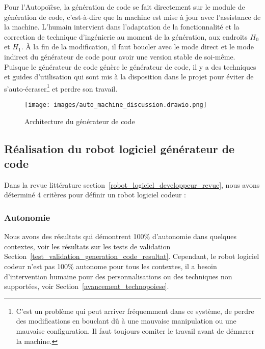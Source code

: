 Pour l'Autopoïèse, la génération de code se fait directement sur le module de génération de code, c'est-à-dire que la machine est mise à jour avec l'assistance de la machine. L'humain intervient dans l'adaptation de la fonctionnalité et la correction de technique d'ingénierie au moment de la génération, aux endroits $H_0$ et $H_1$. À la fin de la modification, il faut boucler avec le mode direct et le mode indirect du générateur de code pour avoir une version stable de soi-même. Puisque le générateur de code génère le générateur de code, il y a des techniques et guides d'utilisation qui sont mis à la disposition dans le projet pour éviter de s'auto-écraser\footnote{C'est un problème qui peut arriver fréquemment dans ce système, de perdre des modifications en bouclant dû à une mauvaise manipulation ou une mauvaise configuration. Il faut toujours comiter le travail avant de démarrer la machine.} et perdre son travail.

\begin{figure}
\centering
\texttt{[image: images/auto\_machine\_discussion.drawio.png]}
\caption{Architecture du générateur de code}
\label{fig:dia_auto_machine_discussion}
\end{figure}


\subsection{Réalisation du robot logiciel générateur de code}
Dans la revue littérature section~\ref{robot_logiciel_developpeur_revue}, nous avons déterminé 4 critères pour définir un robot logiciel codeur :

\subsubsection{Autonomie}
Nous avons des résultats qui démontrent 100\% d'autonomie dans quelques contextes, voir les résultats sur les tests de validation Section~\ref{test_validation_generation_code_resultat}. Cependant, le robot logiciel codeur n'est pas 100\% autonome pour tous les contextes, il a besoin d'intervention humaine pour des personnalisations ou des techniques non supportées, voir Section~\ref{avancement_technopoiese}.


